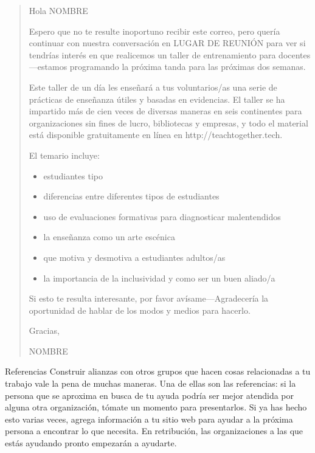 \begin{quote}

  \noindent
  Hola NOMBRE
 
 Espero que no te resulte inoportuno recibir este correo,
 pero quería continuar con nuestra conversación en LUGAR DE REUNIÓN
 para ver si tendrías interés en que realicemos un taller de entrenamiento para docentes---estamos programando  la próxima tanda para las próximas dos semanas.

 Este taller de un día les enseñará a tus voluntarios/as
 una serie de prácticas de enseñanza útiles y basadas en evidencias.
El taller se ha impartido más de cien veces de diversas maneras en seis continentes
 para organizaciones sin fines de lucro, bibliotecas y empresas,
 y todo el material está disponible gratuitamente en línea en http://teachtogether.tech.
 
El temario incluye:

  \begin{itemize}
  \item estudiantes tipo
  \item  diferencias entre diferentes tipos de estudiantes 
  \item uso de evaluaciones formativas para diagnosticar malentendidos
  \item la enseñanza como un arte escénica
  \item que motiva y desmotiva a estudiantes adultos/as
  \item la importancia de la inclusividad y como ser un buen aliado/a
  \end{itemize}

Si esto te resulta interesante,
por favor avísame---Agradecería la oportunidad de hablar de los modos y medios para hacerlo.

Gracias,

  NOMBRE

\end{quote}

\begin{aside}{Referencias}
Construir alianzas con otros grupos que hacen cosas relacionadas a tu trabajo
vale la pena de muchas maneras.
Una de ellas son las referencias:
si la persona que se aproxima en busca de tu ayuda podría ser mejor atendida por alguna otra organización,
tómate un momento para presentarlos.
Si ya has hecho esto varias veces,
agrega información a tu sitio web para ayudar a la próxima persona a encontrar lo que necesita.
En retribución, las organizaciones a las que estás ayudando pronto empezarán a ayudarte.
\end{aside}

